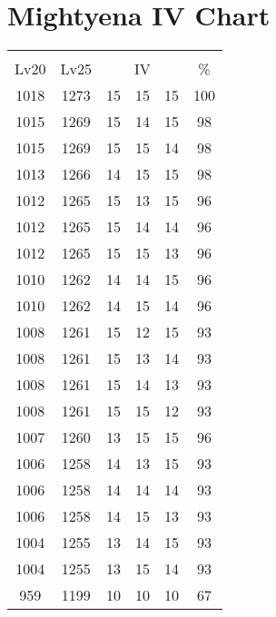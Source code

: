 \documentclass{article}%
\begin{document}
%
\normalsize%
\section{Mightyena IV Chart}%
\label{sec:Mightyena IV Chart}%
\renewcommand{\arraystretch}{1.5}%
\begin{tabular}{|c|c|c|c|c|c|}%
\hline%
\multicolumn{6}{|c|}{\textcolor{white}{ 
\linebreak{Mightyena}
}%
\cellcolor{black}}\\%
\multicolumn{1}{|c}{Lv20}&\multicolumn{1}{c|}{Lv25}&\multicolumn{3}{c|}{IV}&\multicolumn{1}{|c|}{\%}\\%
\hline%
\rowcolor{color100}%
1018&1273&15&15&15&100\\%
\hline%
\rowcolor{color98}%
1015&1269&15&14&15&98\\%
\hline%
\rowcolor{color98}%
1015&1269&15&15&14&98\\%
\hline%
\rowcolor{color98}%
1013&1266&14&15&15&98\\%
\hline%
\rowcolor{color96}%
1012&1265&15&13&15&96\\%
\hline%
\rowcolor{color96}%
1012&1265&15&14&14&96\\%
\hline%
\rowcolor{color96}%
1012&1265&15&15&13&96\\%
\hline%
\rowcolor{color96}%
1010&1262&14&14&15&96\\%
\hline%
\rowcolor{color96}%
1010&1262&14&15&14&96\\%
\hline%
\rowcolor{color93}%
1008&1261&15&12&15&93\\%
\hline%
\rowcolor{color93}%
1008&1261&15&13&14&93\\%
\hline%
\rowcolor{color93}%
1008&1261&15&14&13&93\\%
\hline%
\rowcolor{color93}%
1008&1261&15&15&12&93\\%
\hline%
\rowcolor{color96}%
1007&1260&13&15&15&96\\%
\hline%
\rowcolor{color93}%
1006&1258&14&13&15&93\\%
\hline%
\rowcolor{color93}%
1006&1258&14&14&14&93\\%
\hline%
\rowcolor{color93}%
1006&1258&14&15&13&93\\%
\hline%
\rowcolor{color93}%
1004&1255&13&14&15&93\\%
\hline%
\rowcolor{color93}%
1004&1255&13&15&14&93\\%
\hline%
\rowcolor{color91}%
959&1199&10&10&10&67\\%
\end{tabular}

%
\end{document}
